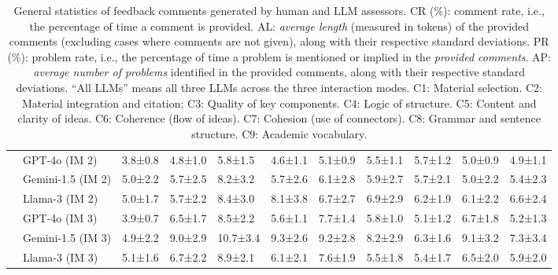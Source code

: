 \begin{table*}[]
\begin{tabular}{lllllllllll}
   &     GPT-4o (IM 2) & 3.8{\tiny±0.8} & 4.8{\tiny±1.0} &  5.8{\tiny±1.5} & 4.6{\tiny±1.1} & 5.1{\tiny±0.9} & 5.5{\tiny±1.1} &  5.7{\tiny±1.2} & 5.0{\tiny±0.9} & 4.9{\tiny±1.1} \\
   & Gemini-1.5 (IM 2) & 5.0{\tiny±2.2} & 5.7{\tiny±2.5} &  8.2{\tiny±3.2} & 5.7{\tiny±2.6} & 6.1{\tiny±2.8} & 5.9{\tiny±2.7} &  5.7{\tiny±2.1} & 5.0{\tiny±2.2} & 5.4{\tiny±2.3} \\
   &    Llama-3 (IM 2) & 5.0{\tiny±1.7} & 5.7{\tiny±2.2} &  8.4{\tiny±3.0} & 8.1{\tiny±3.8} & 6.7{\tiny±2.7} & 6.9{\tiny±2.9} &  6.2{\tiny±1.9} & 6.1{\tiny±2.2} & 6.6{\tiny±2.4} \\ [0.15cm]
   
   &     GPT-4o (IM 3) & 3.9{\tiny±0.7} & 6.5{\tiny±1.7} &  8.5{\tiny±2.2} & 5.6{\tiny±1.1} & 7.7{\tiny±1.4} & 5.8{\tiny±1.0} &  5.1{\tiny±1.2} & 6.7{\tiny±1.8} & 5.2{\tiny±1.3} \\
   & Gemini-1.5 (IM 3) & 4.9{\tiny±2.2} & 9.0{\tiny±2.9} & 10.7{\tiny±3.4} & 9.3{\tiny±2.6} & 9.2{\tiny±2.8} & 8.2{\tiny±2.9} &  6.3{\tiny±1.6} & 9.1{\tiny±3.2} & 7.3{\tiny±3.4} \\
   &    Llama-3 (IM 3) & 5.1{\tiny±1.6} & 6.7{\tiny±2.2} &  8.9{\tiny±2.1} & 6.1{\tiny±2.1} & 7.6{\tiny±1.9} & 5.5{\tiny±1.8} &  5.4{\tiny±1.7} & 6.5{\tiny±2.0} & 5.9{\tiny±2.0} \\
\bottomrule
\end{tabular}

    \caption{General statistics of feedback comments generated by human and LLM assessors. CR (\%): comment rate, i.e., the percentage of time a comment is provided. AL: \textit{average length} (measured in tokens) of the provided comments (excluding cases where comments are not given), along with their respective standard deviations. PR (\%): problem rate, i.e., the percentage of time a problem is mentioned or implied in the \textit{provided comments}. AP: \textit{average number of problems} identified in the provided comments, along with their respective standard deviations. ``All LLMs'' means all three LLMs across the three interaction modes. C1: Material selection. C2: Material integration and citation; C3: Quality of key components. C4: Logic of structure. C5: Content and clarity of ideas. C6: Coherence (flow of ideas). C7: Cohesion (use of connectors). C8: Grammar and sentence structure. C9: Academic vocabulary.}
    \label{tab:generalStatsFeedbackComments}
\end{table*}


